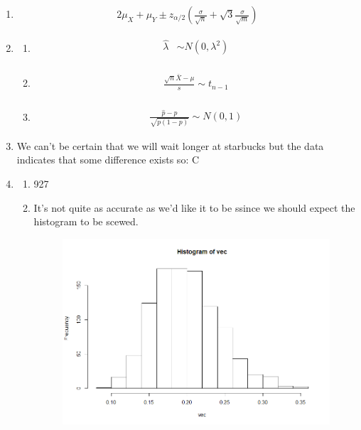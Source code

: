\documentclass{article}
\begin{document}
\begin{enumerate}
\item
	\begin{equation*}
	\begin{split}
	2\mu_{X}+\mu_{Y} \pm z_{\alpha/2} (\frac{\sigma}{\sqrt{n}}+\sqrt{3}\frac{\sigma}{\sqrt{m}})
	\end{split}
	\end{equation*}
\item
	\begin{enumerate}
	\item
	\begin{equation*}
	\begin{split}
	\hat{\lambda} &\sim N(0, \lambda^{2}) \\
	\end{split}
	\end{equation*}
	\item
	\begin{equation*}
	\begin{split}
	\frac{\sqrt{n}\bar{X} -\mu}{s} \sim t_{n-1} \\
	\end{split}
	\end{equation*}
	\item
	\begin{equation*}
	\begin{split}
	\frac{\hat{p}-p}{\sqrt{p(1-p)}} \sim N(0,1)
	\end{split}
	\end{equation*}
	\end{enumerate}
\item
We can't be certain that we will wait longer at starbucks but the data indicates that some difference exists so:
C
\item
	\begin{enumerate}
	\item 927
	\item
	It's not quite as accurate as we'd like it to be ssince we should expect the histogram to be scewed. 
	\begin{figure}
	\includegraphics[scale =.5]{Rplot.png}
	\end{figure}
	\end{enumerate}
\end{enumerate}
\end{document}
